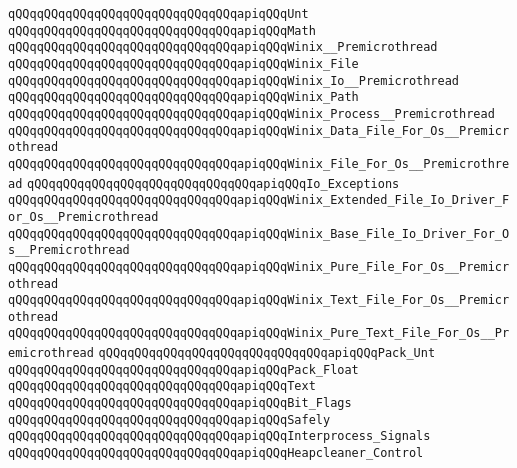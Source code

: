 \verb|qQQqqQQqqQQqqQQqqQQqqQQqqQQqqQQqapiqQQqUnt|\newline
\verb|qQQqqQQqqQQqqQQqqQQqqQQqqQQqqQQqapiqQQqMath|\newline
\verb|qQQqqQQqqQQqqQQqqQQqqQQqqQQqqQQqapiqQQqWinix__Premicrothread|\newline
\verb|qQQqqQQqqQQqqQQqqQQqqQQqqQQqqQQqapiqQQqWinix_File|\newline
\verb|qQQqqQQqqQQqqQQqqQQqqQQqqQQqqQQqapiqQQqWinix_Io__Premicrothread|\newline
\verb|qQQqqQQqqQQqqQQqqQQqqQQqqQQqqQQqapiqQQqWinix_Path|\newline
\verb|qQQqqQQqqQQqqQQqqQQqqQQqqQQqqQQqapiqQQqWinix_Process__Premicrothread|\newline
\verb|qQQqqQQqqQQqqQQqqQQqqQQqqQQqqQQqapiqQQqWinix_Data_File_For_Os__Premicrothread|\newline
\verb|qQQqqQQqqQQqqQQqqQQqqQQqqQQqqQQqapiqQQqWinix_File_For_Os__Premicrothread|\newline
\verb|qQQqqQQqqQQqqQQqqQQqqQQqqQQqqQQqapiqQQqIo_Exceptions|\newline
\verb|qQQqqQQqqQQqqQQqqQQqqQQqqQQqqQQqapiqQQqWinix_Extended_File_Io_Driver_For_Os__Premicrothread|\newline
\verb|qQQqqQQqqQQqqQQqqQQqqQQqqQQqqQQqapiqQQqWinix_Base_File_Io_Driver_For_Os__Premicrothread|\newline
\verb|qQQqqQQqqQQqqQQqqQQqqQQqqQQqqQQqapiqQQqWinix_Pure_File_For_Os__Premicrothread|\newline
\verb|qQQqqQQqqQQqqQQqqQQqqQQqqQQqqQQqapiqQQqWinix_Text_File_For_Os__Premicrothread|\newline
\verb|qQQqqQQqqQQqqQQqqQQqqQQqqQQqqQQqapiqQQqWinix_Pure_Text_File_For_Os__Premicrothread|\newline
\verb|qQQqqQQqqQQqqQQqqQQqqQQqqQQqqQQqapiqQQqPack_Unt|\newline
\verb|qQQqqQQqqQQqqQQqqQQqqQQqqQQqqQQqapiqQQqPack_Float|\newline
\verb|qQQqqQQqqQQqqQQqqQQqqQQqqQQqqQQqapiqQQqText|\newline
\verb|qQQqqQQqqQQqqQQqqQQqqQQqqQQqqQQqapiqQQqBit_Flags|\newline
\verb|qQQqqQQqqQQqqQQqqQQqqQQqqQQqqQQqapiqQQqSafely|\newline
\newline
\verb|qQQqqQQqqQQqqQQqqQQqqQQqqQQqqQQqapiqQQqInterprocess_Signals|\newline
\newline
\verb|qQQqqQQqqQQqqQQqqQQqqQQqqQQqqQQqapiqQQqHeapcleaner_Control|\newline
